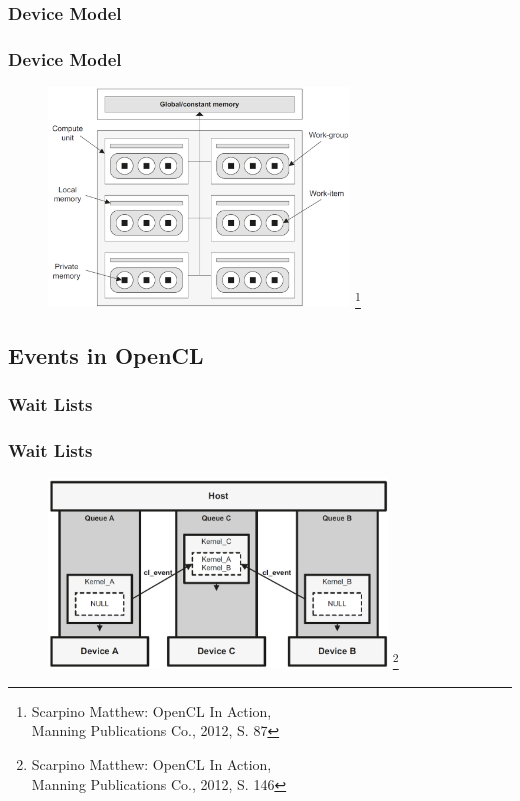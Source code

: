 \documentclass{beamer}
\begin{document}
\subsubsection*{Device Model}
\begin{frame}
\frametitle{Device Model}
\begin{figure}
\begin{center}
\includegraphics[width=8cm]{device_model_manning_p87.PNG}
\footnote{\tiny{Scarpino Matthew: OpenCL In Action, \\Manning Publications Co., 2012, S. 87}}
\end{center}
\end{figure}
\end{frame}

\subsection{Events in OpenCL}

\subsubsection*{Wait Lists}
\begin{frame}
\frametitle{Wait Lists}
\begin{figure}
\begin{center}
\includegraphics[width=9cm]{wait_lists_command_sync_p146.PNG}
\footnote{\tiny{Scarpino Matthew: OpenCL In Action, \\Manning Publications Co., 2012, S. 146}}
\end{center}
\end{figure}
\end{frame}
\end{document}
